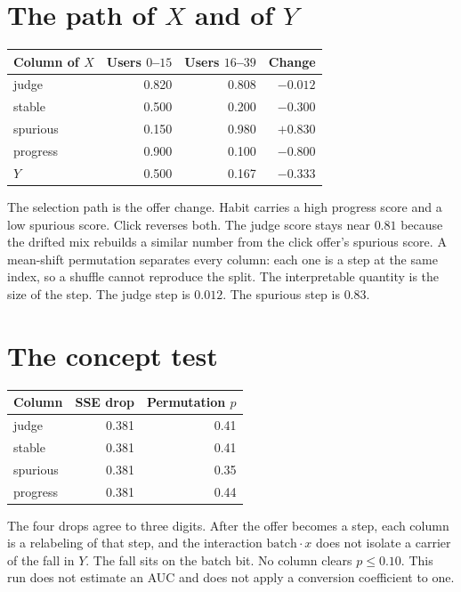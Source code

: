 \documentclass[11pt,a4paper]{article}
\begin{document}
\section{The path of \(X\) and of \(Y\)}
\begin{center}
\begin{tabular}{lrrr}
\toprule
Column of \(X\) & Users \(0\)--\(15\) & Users \(16\)--\(39\) & Change \\
\midrule
judge & 0.820 & 0.808 & \(-0.012\) \\
stable & 0.500 & 0.200 & \(-0.300\) \\
spurious & 0.150 & 0.980 & \(+0.830\) \\
progress & 0.900 & 0.100 & \(-0.800\) \\
\(Y\) & 0.500 & 0.167 & \(-0.333\) \\
\bottomrule
\end{tabular}
\end{center}

The selection path is the offer change. Habit carries a high progress score and a low spurious score. Click reverses both. The judge score stays near \(0.81\) because the drifted mix rebuilds a similar number from the click offer's spurious score. A mean-shift permutation separates every column: each one is a step at the same index, so a shuffle cannot reproduce the split. The interpretable quantity is the size of the step. The judge step is \(0.012\). The spurious step is \(0.83\).

\section{The concept test}
\begin{center}
\begin{tabular}{lrr}
\toprule
Column & SSE drop & Permutation \(p\) \\
\midrule
judge & 0.381 & 0.41 \\
stable & 0.381 & 0.41 \\
spurious & 0.381 & 0.35 \\
progress & 0.381 & 0.44 \\
\bottomrule
\end{tabular}
\end{center}

The four drops agree to three digits. After the offer becomes a step, each column is a relabeling of that step, and the interaction \(\mathrm{batch}\cdot x\) does not isolate a carrier of the fall in \(Y\). The fall sits on the batch bit. No column clears \(p\le 0.10\). This run does not estimate an AUC and does not apply a conversion coefficient to one.
\end{document}
